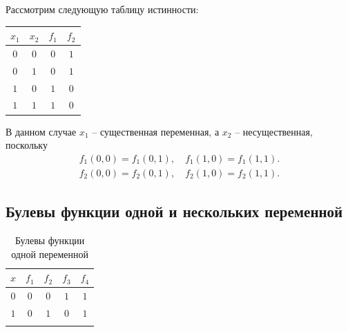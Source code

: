 \begin{example*}
    Рассмотрим следующую таблицу истинности:

    \vspace*{1em}

    {
        \renewcommand*{\arraystretch}{1.5}
        \begin{longtable}{|c|c|c|c|}
            \hline
            \(x_1\) & \(x_2\) & \(f_1\) & \(f_2\) \\
            \hline
            \(0\)   & \(0\)   & \(0\)   & \(1\)   \\
            \hline
            \(0\)   & \(1\)   & \(0\)   & \(1\)   \\
            \hline
            \(1\)   & \(0\)   & \(1\)   & \(0\)   \\
            \hline
            \(1\)   & \(1\)   & \(1\)   & \(0\)   \\
            \hline
        \end{longtable}
    }

    В данном случае \(x_1\) -- существенная переменная, а \(x_2\) -- несущественная, поскольку
    \begin{gather*}
        f_1(0, 0) = f_1(0, 1),
        \quad
        f_1(1, 0) = f_1(1, 1).
        \\
        f_2(0, 0) = f_2(0, 1),
        \quad
        f_2(1, 0) = f_2(1, 1).
    \end{gather*}
\end{example*}

\subsection{Булевы функции одной и нескольких переменной}

{
    \renewcommand*{\arraystretch}{1.5}
    \begin{longtable}{|c|c|c|c|c|}
        \hline
        \(x\) & \(f_1\) & \(f_2\) & \(f_3\) & \(f_4\) \\
        \hline
        \(0\) & \(0\)   & \(0\)   & \(1\)   & \(1\)   \\
        \hline
        \(1\) & \(0\)   & \(1\)   & \(0\)   & \(1\)   \\
        \hline
        \caption{Булевы функции одной переменной}
    \end{longtable}
}

